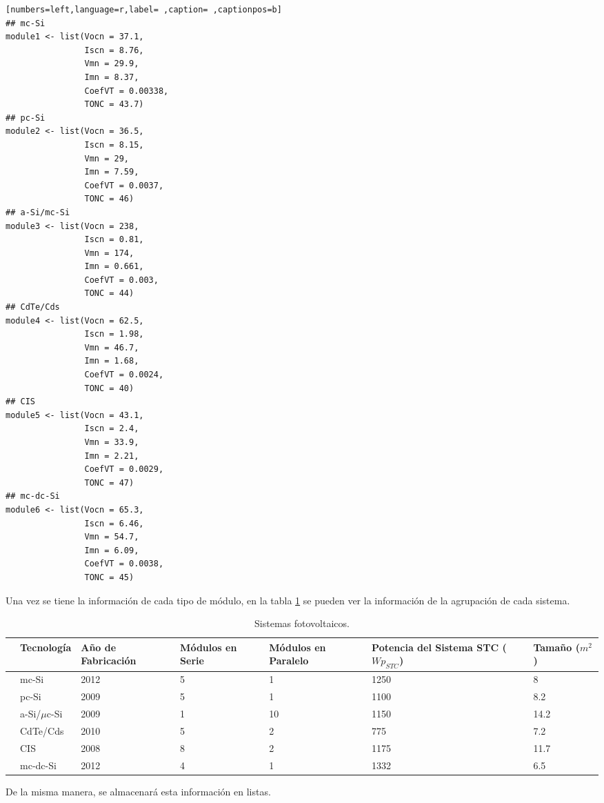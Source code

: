 \begin{lstlisting}[numbers=left,language=r,label= ,caption= ,captionpos=b]
## mc-Si
module1 <- list(Vocn = 37.1,
                Iscn = 8.76,
                Vmn = 29.9,
                Imn = 8.37,
                CoefVT = 0.00338,
                TONC = 43.7)
## pc-Si
module2 <- list(Vocn = 36.5,
                Iscn = 8.15,
                Vmn = 29,
                Imn = 7.59,
                CoefVT = 0.0037,
                TONC = 46)
## a-Si/mc-Si
module3 <- list(Vocn = 238,
                Iscn = 0.81,
                Vmn = 174,
                Imn = 0.661,
                CoefVT = 0.003,
                TONC = 44)
## CdTe/Cds
module4 <- list(Vocn = 62.5,
                Iscn = 1.98,
                Vmn = 46.7,
                Imn = 1.68,
                CoefVT = 0.0024,
                TONC = 40)
## CIS
module5 <- list(Vocn = 43.1,
                Iscn = 2.4,
                Vmn = 33.9,
                Imn = 2.21,
                CoefVT = 0.0029,
                TONC = 47)
## mc-dc-Si
module6 <- list(Vocn = 65.3,
                Iscn = 6.46,
                Vmn = 54.7,
                Imn = 6.09,
                CoefVT = 0.0038,
                TONC = 45)
\end{lstlisting}

Una vez se tiene la información de cada tipo de módulo, en la tabla \ref{tab:sistemas-fotovoltaicos} se pueden ver la información de la agrupación de cada sistema.
\begin{center}
{\footnotesize }%
\begin{table}[]
{\scriptsize \caption{Sistemas fotovoltaicos.\label{tab:sistemas-fotovoltaicos}}}
\centering{}{\scriptsize }\begin{tabular}{*{7}{>{\centering}m{1.85cm}}}
\toprule 
{\scriptsize \textbf{Sistema}} & {\scriptsize \textbf{Tecnología}} & {\scriptsize \textbf{Año de Fabricación}} & {\scriptsize \textbf{Módulos en Serie}} & {\scriptsize \textbf{Módulos en Paralelo}} & {\scriptsize \textbf{Potencia del Sistema STC ($Wp_{STC}$)}} & {\scriptsize \textbf{Tamaño ($m^2$)}}\tabularnewline
\midrule
{\scriptsize 1} & {\scriptsize mc-Si} & {\scriptsize 2012} & {\scriptsize 5} & {\scriptsize 1} & {\scriptsize 1250} & {\scriptsize 8}\tabularnewline
{\scriptsize 2} & {\scriptsize pc-Si} & {\scriptsize 2009} & {\scriptsize 5} & {\scriptsize 1} & {\scriptsize 1100} & {\scriptsize 8.2}\tabularnewline
{\scriptsize 3} & {\scriptsize a-Si/$\mu$c-Si} & {\scriptsize 2009} & {\scriptsize 1} & {\scriptsize 10} & {\scriptsize 1150} & {\scriptsize 14.2}\tabularnewline
{\scriptsize 4} & {\scriptsize CdTe/Cds} & {\scriptsize 2010} & {\scriptsize 5} & {\scriptsize 2} & {\scriptsize 775} & {\scriptsize 7.2}\tabularnewline
{\scriptsize 5} & {\scriptsize CIS} & {\scriptsize 2008} & {\scriptsize 8} & {\scriptsize 2} & {\scriptsize 1175} & {\scriptsize 11.7}\tabularnewline
{\scriptsize 6} & {\scriptsize mc-dc-Si} & {\scriptsize 2012} & {\scriptsize 4} & {\scriptsize 1} & {\scriptsize 1332} & {\scriptsize 6.5}\tabularnewline
\bottomrule
\end{tabular}
\end{table}
\end{center}
De la misma manera, se almacenará esta información en listas.

